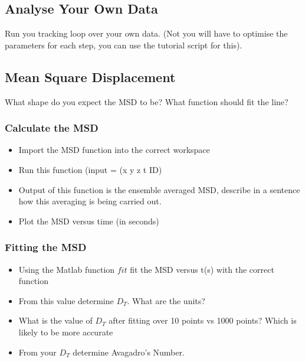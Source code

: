 \documentclass[12pt,a4paper,twoside]{article}
\begin{document}
\subsection{Analyse Your Own Data}
Run you tracking loop over your own data. (Not you will have to optimise the parameters for each step, you can use the tutorial script for this).


\subsection{Mean Square Displacement}

What shape do you expect the MSD to be?
    \vspace{1cm}
What function should fit the line?
    \vspace{1cm}

\subsubsection{Calculate the MSD}

\begin{itemize}
    \item Import the MSD function into the correct workspace
    \item Run this function (input = (x y z t ID)
    \item Output of this function is the ensemble averaged MSD, describe in a sentence how this averaging is being carried out.
    \item Plot the MSD versus time (in seconds)
\end{itemize}

\subsubsection{Fitting the MSD}

\begin{itemize}
    \item Using the Matlab function $fit$ fit the MSD versus t(s) with the correct function
    \item From this value determine $D_T$. What are the units?
        \vspace{1cm}
    \item What is the value of $D_T$ after fitting over 10 points vs 1000 points? Which is likely to be more accurate
        \vspace{1cm}
    \item From your $D_T$ determine Avagadro's Number.
        \vspace{1cm}
\end{itemize}
\end{document}
